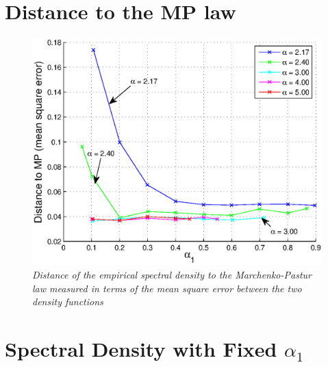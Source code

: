 \documentclass{article}
\begin{document}
\section{Distance to the MP law}
\begin{figure}[htb!]
  \centering
    \includegraphics[scale=0.6]{../pics/Distance_to_MP.eps}
    \caption{\small \it Distance of the empirical spectral density to
      the Marchenko-Pastur law measured in terms of the mean square
      error between the two density functions}
    \label{fig:Distance_to_MP}
\end{figure}

\section{Spectral Density with Fixed $\alpha_1$}

\end{document}
